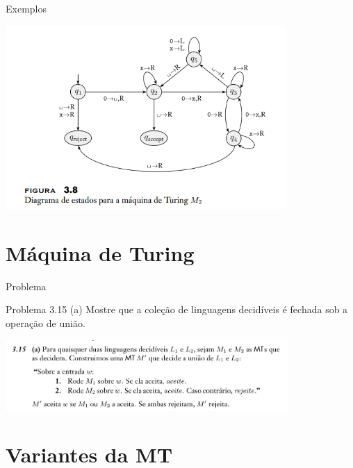 \documentclass[xcolor=dvipsnames,table]{beamer}
\begin{document}
	\begin{frame}{Exemplos}
		\begin{center}
			\includegraphics[height=7cm]{images/fig38.png}
		\end{center}
	\end{frame}
	
	\section{Máquina de Turing}
	\begin{frame}{Problema}
		\begin{block}{Problema 3.15 (a)}
			Mostre que a coleção de linguagens decidíveis é fechada sob a operação de união.		
		\end{block} \pause
		\begin{center}
			\includegraphics[height=2.7cm]{images/ex3-15a}
		\end{center}
	\end{frame}
	
	\section{Variantes da MT}
\end{document}
